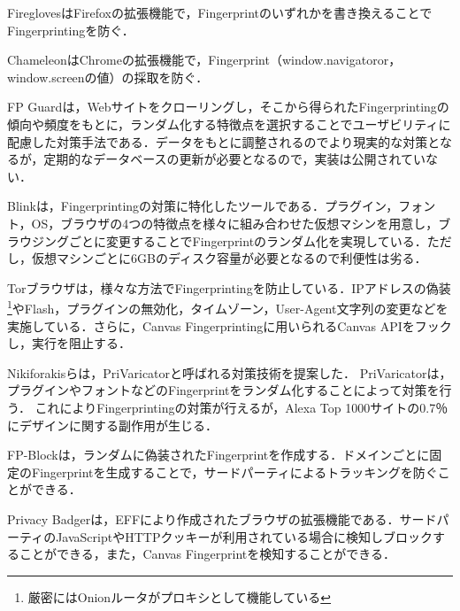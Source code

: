 Firegloves\cite{firegloves}はFirefoxの拡張機能で，Fingerprintのいずれかを書き換えることでFingerprintingを防ぐ．

Chameleon\cite{chamereon}はChromeの拡張機能で，Fingerprint（window.navigatoror，window.screenの値）の採取を防ぐ．

FP Guard\cite{faizkhademi2015fpguard}は，Webサイトをクローリングし，そこから得られたFingerprintingの傾向や頻度をもとに，ランダム化する特徴点を選択することでユーザビリティに配慮した対策手法である．データをもとに調整されるのでより現実的な対策となるが，定期的なデータベースの更新が必要となるので，実装は公開されていない．

Blink\cite{blink}は，Fingerprintingの対策に特化したツールである．プラグイン，フォント，OS，ブラウザの4つの特徴点を様々に組み合わせた仮想マシンを用意し，ブラウジングごとに変更することでFingerprintのランダム化を実現している．ただし，仮想マシンごとに6GBのディスク容量が必要となるので利便性は劣る．

Torブラウザ\cite{tor}は，様々な方法でFingerprintingを防止している．IPアドレスの偽装\footnote{厳密にはOnionルータがプロキシとして機能している}やFlash，プラグインの無効化，タイムゾーン，User-Agent文字列の変更などを実施している．さらに，Canvas Fingerprintingに用いられるCanvas APIをフックし，実行を阻止する．

Nikiforakis\cite{nikiforakis2015privaricator}らは，PriVaricatorと呼ばれる対策技術を提案した．
PriVaricatorは，プラグインやフォントなどのFingerprintをランダム化することによって対策を行う．
これによりFingerprintingの対策が行えるが，Alexa Top 1000サイトの0.7％にデザインに関する副作用が生じる．

FP-Block\cite{torres2015fp}は，ランダムに偽装されたFingerprintを作成する．ドメインごとに固定のFingerprintを生成することで，サードパーティによるトラッキングを防ぐことができる．

Privacy Badger\cite{privacybadger}は，EFFにより作成されたブラウザの拡張機能である．サードパーティのJavaScriptやHTTPクッキーが利用されている場合に検知しブロックすることができる，また，Canvas Fingerprintを検知することができる．
